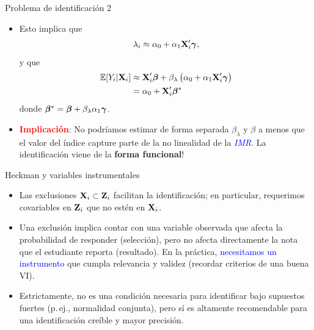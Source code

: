 \documentclass[10pt, xcolor=dvipsnames]{beamer}
\begin{document}
\begin{frame}{Problema de identificación 2}
\begin{itemize}\setlength{\itemsep}{1em}
    \item Esto implica que   
    \begin{align*}
        \lambda_i \approx \alpha_0 + \alpha_1 \textbf{X}'_i\boldsymbol{\gamma}, 
    \end{align*}
    y que 
    \begin{align*}
    \begin{split}
        \operatorname{\mathbb{E}}[Y_i|\textbf{X}_i] &\approx \textbf{X}'_i\boldsymbol{\beta} + \beta_{\lambda} \left(\alpha_0 + \alpha_1 \textbf{X}'_i\boldsymbol{\gamma}\right) \\
                       &= \alpha_0 + \textbf{X}'_i\boldsymbol{\beta}^*
    \end{split}
    \end{align*}
    donde \(\boldsymbol{\beta}^* = \boldsymbol{\beta} + \beta_{\lambda} \alpha_1 \boldsymbol{\gamma}\). %
    \item \textcolor{red}{\textbf{Implicación}}: No podríamos estimar de forma separada \(\beta_{\lambda}\) y \(\beta\) a menos que el valor del índice capture parte de la no linealidad de la \textcolor{blue}{\textit{IMR}}. La identificación viene de la \textbf{forma funcional}!    
\end{itemize}
\end{frame}


\begin{frame}{Heckman y variables instrumentales}
\begin{itemize}\setlength{\itemsep}{1em}
    \item Las exclusiones \( \textbf{X}_i \subset \textbf{Z}_i \) facilitan la identificación; en particular, requerimos covariables en \( \textbf{Z}_i \) que no estén en \( \textbf{X}_i \). %
    \item  Una exclusión implica contar con una variable observada que afecta la probabilidad de responder (selección), pero no afecta directamente la nota que el estudiante reporta (resultado). En la práctica, \textcolor{blue}{necesitamos un instrumento} que cumpla relevancia y validez (recordar criterios de una buena VI). %
    \item Estrictamente, no es una condición necesaria para identificar bajo supuestos fuertes (p.\,ej., normalidad conjunta), pero sí es altamente recomendable para una identificación creíble y mayor precisión.
\end{itemize}
\end{frame}


\end{document}
